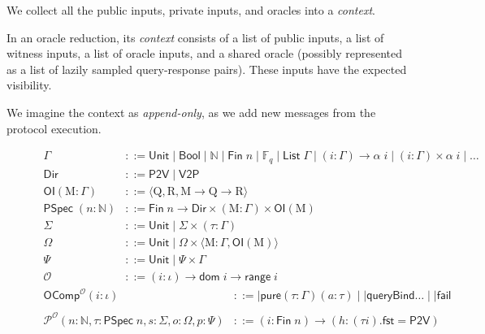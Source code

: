 We collect all the public inputs, private inputs, and oracles into a \emph{context}.

\begin{definition}[Context]\label{def:context}
    In an oracle reduction, its \emph{context} consists of a list of public inputs, a list of witness inputs, a list of oracle inputs, and a shared oracle (possibly represented as a list of lazily sampled query-response pairs). These inputs have the expected visibility.
\end{definition}

We imagine the context as \emph{append-only}, as we add new messages from the protocol execution.

\begin{figure}[t]
    \begin{align*}
        \Gamma &::= \mathsf{Unit} \mid \mathsf{Bool} \mid \mathbb{N} \mid \mathsf{Fin}\; n \mid \mathbb{F}_q \mid \mathsf{List}\;\Gamma \mid (i : \Gamma) \to \alpha\; i \mid (i : \Gamma) \times \alpha\; i \mid \dots \\[1em]
        \mathsf{Dir} &::= \mathsf{P2V} \mid \mathsf{V2P} \\ 
        \mathsf{OI} (\mathrm{M} : \Gamma) &::= \langle \mathrm{Q}, \mathrm{R}, \mathrm{M} \to \mathrm{Q} \to \mathrm{R} \rangle \\
        \mathsf{PSpec}\; (n : \mathbb{N}) &::= \mathsf{Fin}\; n \to \mathsf{Dir} \times (\mathrm{M} : \Gamma) \times \mathsf{OI}(\mathrm{M}) \\[1em]
        \varSigma &::= \mathsf{Unit} \mid \varSigma \times (\tau : \Gamma) \\
        \Omega &::= \mathsf{Unit} \mid \Omega \times \langle \mathrm{M} : \Gamma, \mathsf{OI}(\mathrm{M}) \rangle \\
        \Psi &::= \mathsf{Unit} \mid \Psi \times \Gamma\\
        \mathcal{O} &::= (i : \iota) \to \mathsf{dom}\; i \to \mathsf{range}\; i
    \end{align*}
    \begin{align*}
        \mathsf{OComp}^{\mathcal{O}} (i : \iota) &::= \big| \mathsf{pure} (\tau : \Gamma) (a : \tau) \mid \big| \mathsf{queryBind} \dots \mid \big| \mathsf{fail} \\
        \\
        \mathcal{P}^{\mathcal{O}} (n : \mathbb{N}, \tau : \mathsf{PSpec}\; n, s : \varSigma, o : \Omega, p : \Psi) &::= (i : \mathsf{Fin}\; n) \to (h : (\tau i).\mathsf{fst} = \mathsf{P2V}) \\

\end{align*}
\end{figure}

